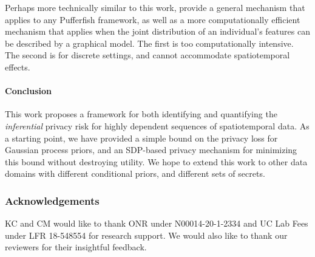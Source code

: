 Perhaps more technically similar to this work, \cite{song_pufferfish_2017} provide a general mechanism that applies to any Pufferfish framework, as well as a more computationally efficient mechanism that applies when the joint distribution of an individual's features can be described by a graphical model. The first is too computationally intensive. The second is for discrete settings, and cannot accommodate spatiotemporal effects.

\paragraph{Conclusion}
This work proposes a framework for both identifying and quantifying the \emph{inferential} privacy risk for highly dependent sequences of spatiotemporal data. As a starting point, we have provided a simple bound on the privacy loss for Gaussian process priors, and an SDP-based privacy mechanism for minimizing this bound without destroying utility. We hope to extend this work to other data domains with different conditional priors, and different sets of secrets.

\subsubsection*{Acknowledgements}
KC and CM would like to thank ONR under N00014-20-1-2334 and UC Lab Fees under LFR 18-548554  for research support. We would also like to thank our reviewers for their insightful feedback. 